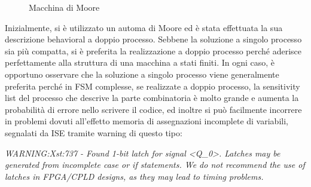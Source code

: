 \begin{figure}[ht]
\begin{centering}
\begin{center}
\end{center}
\par\end{centering}
\caption{\label{fig:fsmMoore}Macchina di Moore}
\end{figure}



Inizialmente, si è utilizzato un automa di Moore ed è stata effettuata la sua descrizione behavioral a doppio processo. Sebbene la soluzione a singolo processo sia più compatta, si è preferita la realizzazione a doppio processo perché aderisce perfettamente alla struttura di una macchina a stati finiti. In ogni caso, è opportuno osservare che la soluzione a singolo processo viene generalmente preferita perché in FSM complesse, se realizzate a doppio processo, la sensitivity list del processo che descrive la parte combinatoria è molto grande e aumenta la probabilità di errore nello scrivere il codice, ed inoltre si può facilmente incorrere in problemi dovuti all'effetto memoria di assegnazioni incomplete di variabili, segnalati da ISE tramite warning di questo tipo:

\begin{framed} 
\textit{WARNING:Xst:737 - Found 1-bit latch for signal <Q\_0>. Latches may be generated from incomplete case or if statements. We do not recommend the use of latches in FPGA/CPLD designs, as they may lead to timing problems.}
\end{framed}


